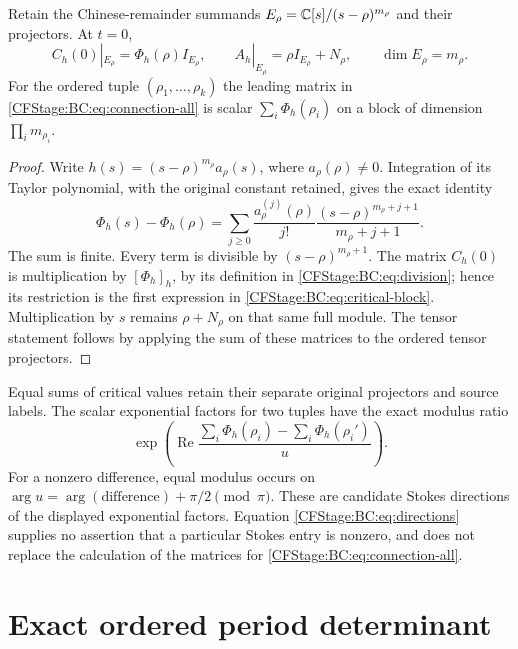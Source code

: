 \begin{proposition}
Retain the Chinese-remainder summands
$E_\rho=\mathbb C[s]/(s-\rho)^{m_\rho}$ and their projectors.  At $t=0$,
\begin{equation}
 C_h(0)|_{E_\rho}=\Phi_h(\rho)I_{E_\rho},\qquad
 A_h|_{E_\rho}=\rho I_{E_\rho}+N_\rho,\qquad
 \dim E_\rho=m_\rho.
 \label{CFStage:BC:eq:critical-block}
\end{equation}
For the ordered tuple $(\rho_1,\ldots,\rho_k)$ the leading matrix in
\eqref{CFStage:BC:eq:connection-all} is scalar
$\sum_i\Phi_h(\rho_i)$ on a block of dimension
$\prod_i m_{\rho_i}$.
\end{proposition}
\begin{proof}
Write $h(s)=(s-\rho)^{m_\rho}a_\rho(s)$, where
$a_\rho(\rho)\ne0$.  Integration of its Taylor polynomial, with the
original constant retained, gives the exact identity
\begin{equation}
 \Phi_h(s)-\Phi_h(\rho)=
 \sum_{j\ge0}\frac{a_\rho^{(j)}(\rho)}{j!}
       \frac{(s-\rho)^{m_\rho+j+1}}{m_\rho+j+1}.
 \label{CFStage:BC:eq:full-taylor}
\end{equation}
The sum is finite.  Every term is divisible by
$(s-\rho)^{m_\rho+1}$.  The matrix $C_h(0)$ is multiplication by
$[\Phi_h]_h$, by its definition in \eqref{CFStage:BC:eq:division}; hence its
restriction is the first expression in \eqref{CFStage:BC:eq:critical-block}.
Multiplication by $s$ remains $\rho+N_\rho$ on that same full module.
The tensor statement follows by applying the sum of these matrices
to the ordered tensor projectors.
\end{proof}

Equal sums of critical values retain their separate original projectors
and source labels.  The scalar exponential factors for two tuples have
the exact modulus ratio
\begin{equation}
 \exp\!\left(\operatorname{Re}
      \frac{\sum_i\Phi_h(\rho_i)-\sum_i\Phi_h(\rho_i')}{u}\right).
 \label{CFStage:BC:eq:directions}
\end{equation}
For a nonzero difference, equal modulus occurs on
$\arg u=\arg(\text{difference})+\pi/2\pmod\pi$.
These are candidate Stokes directions of the displayed exponential
factors.  Equation \eqref{CFStage:BC:eq:directions} supplies no assertion that a
particular Stokes entry is nonzero, and does not replace the calculation
of the matrices for \eqref{CFStage:BC:eq:connection-all}.

\section{Exact ordered period determinant}

